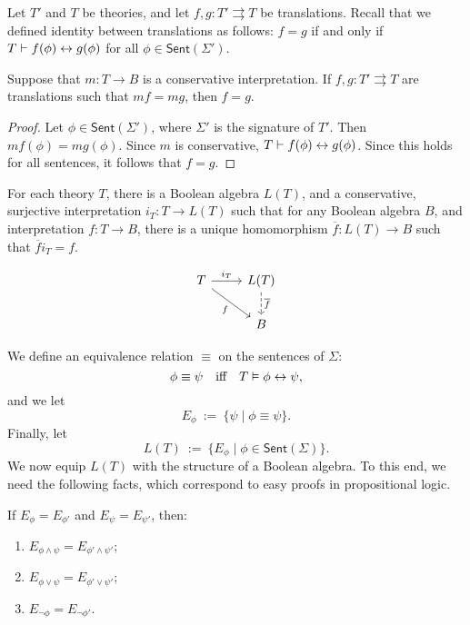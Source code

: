 Let $T'$ and $T$ be theories, and let $f,g:T'\rightrightarrows T$ be
translations.  Recall that we defined identity between translations as
follows: $f=g$ if and only if $T\vdash f(\phi )\leftrightarrow g(\phi )$ for all
$\phi \in \mathsf{Sent}(\Sigma ')$.

\begin{lemma} Suppose that $m:T\to B$ is a conservative
  interpretation.  If $f,g:T'\rightrightarrows T$ are translations
  such that $mf=mg$, then $f=g$.  \end{lemma}

\begin{proof} Let $\phi\in \mathsf{Sent}(\Sigma ')$, where $\Sigma '$
  is the signature of $T'$.  Then $mf(\phi )=mg(\phi )$.  Since $m$ is
  conservative, $T\vdash f(\phi )\leftrightarrow g(\phi )$.  Since this holds for
  all sentences, it follows that $f=g$.
\end{proof}



\begin{prop} For each theory $T$, there is a Boolean algebra $L(T)$,
  and a conservative, surjective interpretation $i_T:T\to L(T)$ such
  that for any Boolean algebra $B$, and interpretation $f:T\to B$,
  there is a unique homomorphism $\overline{f}:L(T)\to B$ such that
  $\overline{f}i_T=f$.  \label{lindenbaum} \end{prop}

\[ \begin{tikzcd} T \arrow[r,"i_T"] \arrow[dr,"f"'] & L(T)
  \arrow[dashed,d,"\overline{f}"] \\
& B \end{tikzcd} \]

  We define an equivalence relation $\equiv$ on the
sentences of $\Sigma$:
\[ \phi \equiv \psi \quad \text{iff} \quad T\vDash \phi\leftrightarrow\psi ,\]
and we let \[ E_{\phi} \: := \: \{ \psi \mid \phi\equiv \psi \} .\]
Finally, let
\[ L(T) \: := \: \{ E_\phi \mid \phi \in \mathsf{Sent}(\Sigma ) \} .\]
We now equip $L(T)$ with the structure of a Boolean algebra.  To this
end, we need the following facts, which correspond to easy proofs in
propositional logic.

\begin{fact} If $E_{\phi}=E_{\phi '}$ and $E_{\psi}=E_{\psi '}$, then:
\begin{enumerate}
\item $E_{\phi\wedge\psi}=E_{\phi '\wedge \psi '}$;
\item $E_{\phi\vee\psi}=E_{\phi '\vee \psi '}$;
\item $E_{\neg \phi}=E_{\neg \phi '}$. \end{enumerate} \end{fact}

